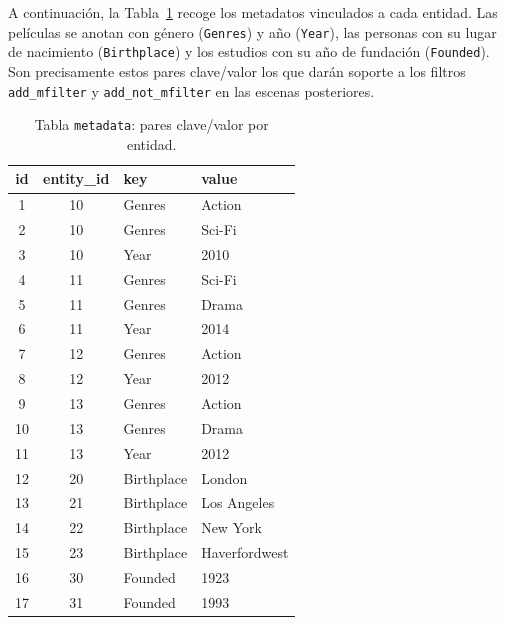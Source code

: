 \FloatBarrier

A continuación, la Tabla~\ref{tab:ejemplo_metadata} recoge los metadatos
vinculados a cada entidad. Las películas se anotan con género
(\texttt{Genres}) y año (\texttt{Year}), las personas con su lugar de
nacimiento (\texttt{Birthplace}) y los estudios con su año de fundación
(\texttt{Founded}). Son precisamente estos pares clave/valor los que
darán soporte a los filtros \texttt{add\_mfilter} y
\texttt{add\_not\_mfilter} en las escenas posteriores.

\begin{table}[h]
  \centering
  \footnotesize
  \begin{tabular}{|c|c|l|l|}
    \hline
    \textbf{id} & \textbf{entity\_id} & \textbf{key} & \textbf{value} \\ \hline
    1  & 10 & Genres     & Action        \\ \hline
    2  & 10 & Genres     & Sci-Fi        \\ \hline
    3  & 10 & Year       & 2010          \\ \hline
    4  & 11 & Genres     & Sci-Fi        \\ \hline
    5  & 11 & Genres     & Drama         \\ \hline
    6  & 11 & Year       & 2014          \\ \hline
    7  & 12 & Genres     & Action        \\ \hline
    8  & 12 & Year       & 2012          \\ \hline
    9  & 13 & Genres     & Action        \\ \hline
    10 & 13 & Genres     & Drama         \\ \hline
    11 & 13 & Year       & 2012          \\ \hline
    12 & 20 & Birthplace & London        \\ \hline
    13 & 21 & Birthplace & Los Angeles   \\ \hline
    14 & 22 & Birthplace & New York      \\ \hline
    15 & 23 & Birthplace & Haverfordwest \\ \hline
    16 & 30 & Founded    & 1923          \\ \hline
    17 & 31 & Founded    & 1993          \\ \hline
  \end{tabular}
  \caption[Tabla \texttt{metadata} del mini-\textit{dataset}]{Tabla \texttt{metadata}: pares clave/valor por entidad.}
  \label{tab:ejemplo_metadata}
\end{table}

